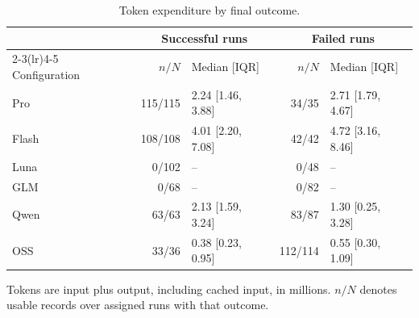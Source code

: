 \begin{table}[tbp]
  \centering
  \footnotesize
  \caption{Token expenditure by final outcome.}
  \label{tab:execution-effort}
  \begin{tabularx}{\linewidth}{@{}Xrlrl@{}}
    \toprule
    & \multicolumn{2}{c}{Successful runs} & \multicolumn{2}{c}{Failed runs} \\
    \cmidrule(lr){2-3}\cmidrule(lr){4-5}
    Configuration & $n/N$ & Median [IQR] & $n/N$ & Median [IQR] \\
    \midrule
    Pro & 115/115 & 2.24 [1.46, 3.88] & 34/35 & 2.71 [1.79, 4.67] \\
    Flash & 108/108 & 4.01 [2.20, 7.08] & 42/42 & 4.72 [3.16, 8.46] \\
    Luna & 0/102 & -- & 0/48 & -- \\
    GLM & 0/68 & -- & 0/82 & -- \\
    Qwen & 63/63 & 2.13 [1.59, 3.24] & 83/87 & 1.30 [0.25, 3.28] \\
    OSS & 33/36 & 0.38 [0.23, 0.95] & 112/114 & 0.55 [0.30, 1.09] \\
    \bottomrule
  \end{tabularx}
  \par\smallskip\begin{minipage}{\linewidth}\scriptsize
  Tokens are input plus output, including cached input, in millions. $n/N$ denotes usable records over assigned runs with that outcome.
  \end{minipage}
\end{table}
